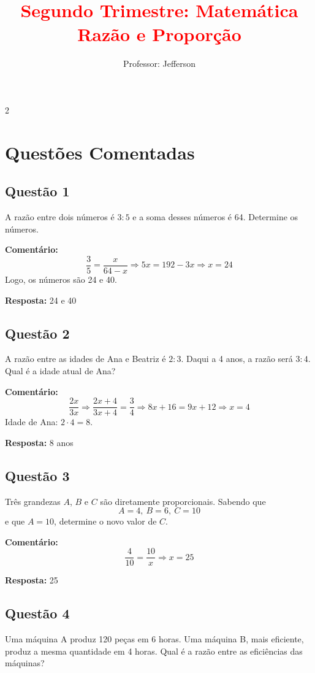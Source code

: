 \documentclass[11pt]{article}
\title{\textcolor{red}{Segundo Trimestre: Matemática\\Razão e Proporção}}
\author{Professor: Jefferson}
\date{}
\begin{document}
\maketitle
\vspace{-1cm}

\begin{multicols}{2}

\section*{Questões Comentadas}

\subsection*{Questão 1}
A razão entre dois números é $3:5$ e a soma desses números é 64. Determine os números.

\textbf{Comentário:}
\[
\frac{3}{5} = \frac{x}{64-x}
\Rightarrow 5x = 192 - 3x
\Rightarrow x = 24
\]
Logo, os números são 24 e 40.

\textbf{Resposta:} 24 e 40

\subsection*{Questão 2}
A razão entre as idades de Ana e Beatriz é $2:3$. Daqui a 4 anos, a razão será $3:4$. Qual é a idade atual de Ana?

\textbf{Comentário:}
\[
\frac{2x}{3x} \Rightarrow
\frac{2x + 4}{3x + 4} = \frac{3}{4}
\Rightarrow 8x + 16 = 9x + 12
\Rightarrow x = 4
\]
Idade de Ana: $2 \cdot 4 = 8$.

\textbf{Resposta:} 8 anos

\subsection*{Questão 3}
Três grandezas $A$, $B$ e $C$ são diretamente proporcionais. Sabendo que
\[
A = 4,\ B = 6,\ C = 10
\]
e que $A = 10$, determine o novo valor de $C$.

\textbf{Comentário:}
\[
\frac{4}{10} = \frac{10}{x}
\Rightarrow x = 25
\]

\textbf{Resposta:} 25

\subsection*{Questão 4}
Uma máquina A produz 120 peças em 6 horas. Uma máquina B, mais eficiente, produz a mesma quantidade em 4 horas. Qual é a razão entre as eficiências das máquinas?


\end{multicols}
\end{document}
